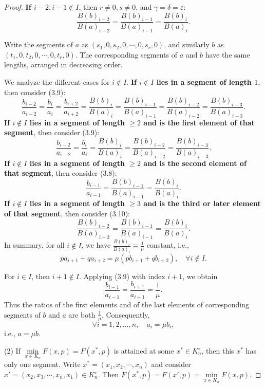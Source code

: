 \documentclass[a4paper,fleqn,numbers]{cas-sc}
\begin{document}
\begin{proof}
		\textbf{If $i-2,i-1 \notin I$}, then $r\neq 0, s\neq 0$, and $\gamma = \delta = \varepsilon$:
		\[
		\frac{B(b)_{i-2}}{B(a)_{i-2}} = \frac{B(b)_{i-1}}{B(a)_{i-1}} = \frac{B(b)_i}{B(a)_i}.\tag{3.10}
		\]
		
		Write the segments of $a$ as $(s_1,0,s_2,0,\cdots,0,s_r,0)$, and similarly $b$ as $(t_1,0,t_2,0,\cdots,0,t_r,0)$. The corresponding segments of $a$ and $b$ have the same lengths, arranged in decreasing order.
		
		We analyze the different cases for $i \notin I$. \textbf{If $i \notin I$ lies in a segment of length $1$}, then consider (3.9):
		\[
		\frac{b_{i-2}}{a_{i-2}} = \frac{b_{i}}{a_{i}} = \frac{b_{i+2}}{a_{i+2}} = \frac{B(b)_i}{B(a)_i} = \frac{B(b)_{i-1}}{B(a)_{i-1}} = \frac{B(b)_{i-2}}{B(a)_{i-2}} = \frac{B(b)_{i-3}}{B(a)_{i-3}}.
		\]
		\textbf{If $i \notin I$ lies in a segment of length $\geq 2$ and is the first element of that segment}, then consider (3.9):
		\[
		\frac{b_{i-2}}{a_{i-2}} = \frac{b_{i}}{a_{i}} = \frac{B(b)_i}{B(a)_i} = \frac{B(b)_{i-2}}{B(a)_{i-2}} = \frac{B(b)_{i-3}}{B(a)_{i-3}}.
		\]
		\textbf{If $i \notin I$ lies in a segment of length $\geq 2$ and is the second element of that segment}, then consider (3.8):
		\[
		\frac{b_{i-1}}{a_{i-1}} = \frac{B(b)_{i-1}}{B(a)_{i-1}} = \frac{B(b)_i}{B(a)_i}.
		\]
		\textbf{If $i \notin I$ lies in a segment of length $\geq 3$ and is the third or later element of that segment}, then consider (3.10):
		\[
		\frac{B(b)_{i-2}}{B(a)_{i-2}} = \frac{B(b)_{i-1}}{B(a)_{i-1}} = \frac{B(b)_i}{B(a)_i}.
		\]
		In summary, for all $i \notin I$, we have $\frac{B(b)_{i}}{B(a)_{i}} \equiv \frac{1}{\mu}$ constant, i.e.,
		\[
		p a_{i+1}+q a_{i+2} = \mu (p b_{i+1}+q b_{i+2}), \quad \forall i \notin I.
		\]
		
		For $i \in I$, then $i+1 \notin I$. Applying (3.9) with index $i+1$, we obtain
		\[
		\frac{b_{i-1}}{a_{i-1}} = \frac{b_{i+1}}{a_{i+1}} = \frac{1}{\mu}.
		\]
		Thus the ratios of the first elements and of the last elements of corresponding segments of $b$ and $a$ are both $\frac{1}{\mu}$. Consequently,
		\[
		\forall i =1,2,\ldots,n,\quad a_i = \mu b_i,
		\]
		i.e., $a = \mu b$.
		
		(2) If \(\min\limits_{x \in K_n} F(x,p) = F(x^*,p)\) is attained at some \(x^* \in K_n^\circ\), then this \(x^*\) has only one segment. Write \(x^*=(x_1,x_2,\cdots,x_n)\) and consider \(x'=(x_2,x_3,\cdots,x_n,x_1)\in K_n^\circ\). Then \(F(x^*,p)=F(x',p)=\min\limits_{x \in K_n} F(x,p)\).
		

\end{proof}
\end{document}
